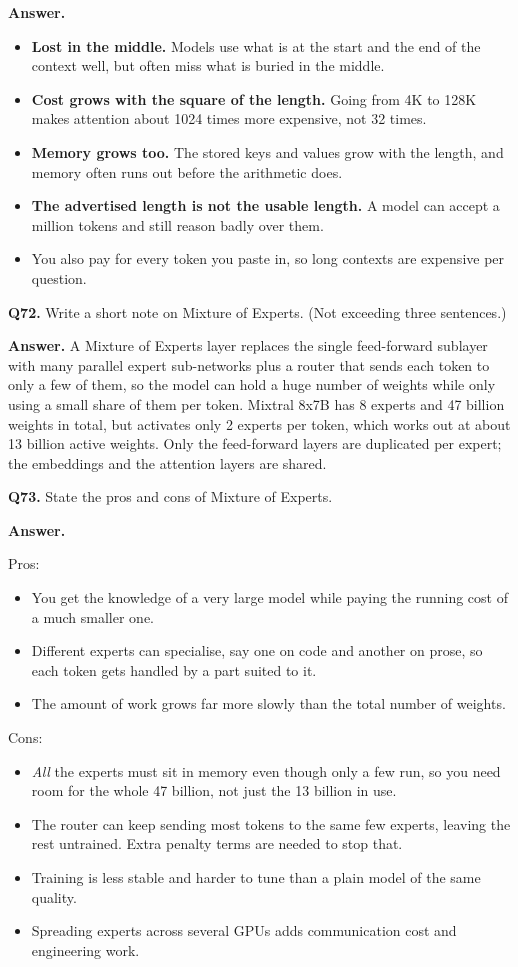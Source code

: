 \documentclass[11pt]{article}
\begin{document}
\textbf{Answer.}
\begin{itemize}
  \item \textbf{Lost in the middle.} Models use what is at the start and the end of the context well, but often miss what is buried in the middle.
  \item \textbf{Cost grows with the square of the length.} Going from 4K to 128K makes attention about 1024 times more expensive, not 32 times.
  \item \textbf{Memory grows too.} The stored keys and values grow with the length, and memory often runs out before the arithmetic does.
  \item \textbf{The advertised length is not the usable length.} A model can accept a million tokens and still reason badly over them.
  \item You also pay for every token you paste in, so long contexts are expensive per question.
\end{itemize}

\medskip
\textbf{Q72.} Write a short note on Mixture of Experts. (Not exceeding three sentences.)

\textbf{Answer.} A Mixture of Experts layer replaces the single feed-forward sublayer with
many parallel expert sub-networks plus a router that sends each token to only a few of them,
so the model can hold a huge number of weights while only using a small share of them per
token. Mixtral 8x7B has 8 experts and 47 billion weights in total, but activates only 2
experts per token, which works out at about 13 billion active weights. Only the feed-forward
layers are duplicated per expert; the embeddings and the attention layers are shared.

\medskip
\textbf{Q73.} State the pros and cons of Mixture of Experts.

\textbf{Answer.}

Pros:
\begin{itemize}
  \item You get the knowledge of a very large model while paying the running cost of a much smaller one.
  \item Different experts can specialise, say one on code and another on prose, so each token gets handled by a part suited to it.
  \item The amount of work grows far more slowly than the total number of weights.
\end{itemize}

Cons:
\begin{itemize}
  \item \emph{All} the experts must sit in memory even though only a few run, so you need room for the whole 47 billion, not just the 13 billion in use.
  \item The router can keep sending most tokens to the same few experts, leaving the rest untrained. Extra penalty terms are needed to stop that.
  \item Training is less stable and harder to tune than a plain model of the same quality.
  \item Spreading experts across several GPUs adds communication cost and engineering work.
\end{itemize}
\end{document}
